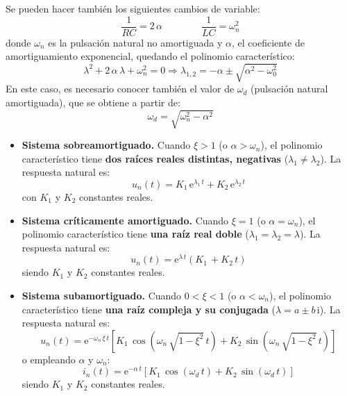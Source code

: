 	\begin{remark}
	Se pueden hacer también los siguientes cambios de variable: 
	\begin{equation*}
	    {\dfrac{1}{RC}=2\,\alpha}\qquad \qquad {\dfrac{1}{LC}=\omega_n^2}
	\end{equation*}
	donde $\omega_n$ es la pulsación natural no amortiguada y $\alpha$, el coeficiente de amortiguamiento exponencial, quedando el polinomio característico: 
	\begin{equation*}
	    \lambda^2+2\,\alpha\,\lambda + \omega_n^2=0 \Rightarrow \lambda_{1,2}=-\alpha \pm \sqrt{\alpha^2 - \omega_0^2}
	\end{equation*}
	En este caso, es necesario conocer también el valor de $\omega_d$ (pulsación natural amortiguada), que se obtiene a partir de:
	\begin{equation*}
	    \omega_d=\sqrt{\omega_n^2-\alpha^2}
	\end{equation*}
	\end{remark}
	
	\begin{itemize}
	    \item \textbf{Sistema sobreamortiguado.} Cuando $\xi>1$ (o $\alpha>\omega_n$), el polinomio característico tiene \textbf{dos raíces reales distintas, negativas} ($\lambda_1\neq\lambda_2$). La respuesta natural es:
    	\begin{equation*}
    	 u_n(t)=K_1\,\mathrm{e}^{\lambda_1\,t}+K_2\,\mathrm{e}^{\lambda_2\,t}   
    	\end{equation*}
	con $K_1$ y $K_2$ constantes reales. 
	    \item \textbf{Sistema críticamente amortiguado.} Cuando $\xi=1$ (o $\alpha=\omega_n$), el polinomio característico tiene \textbf{una raíz real doble} ($\lambda_1=\lambda_2=\lambda$). La respuesta natural es:
	\begin{equation*}
	 u_n(t)=\mathrm{e}^{\lambda\,t}(K_1\,+K_2\,t)   
	\end{equation*}
	siendo $K_1$ y $K_2$ constantes reales. 
	\item \textbf{Sistema subamortiguado.} Cuando $0<\xi<1$ (o $\alpha<\omega_n$), el polinomio característico tiene \textbf{una raíz compleja y su conjugada} ($\lambda=a\pm b\,\mathrm{i}$). La respuesta natural es:
	\begin{equation*}
          u_n(t)=\mathrm{e}^{-\omega_n\,\xi \,t}\left[K_1\,\cos(\omega_n\,\sqrt{1-\xi^2}\,t)+K_2\,\sin(\omega_n\,\sqrt{1-\xi^2}\,t) \right]
        \end{equation*}
	o empleando $\alpha$ y $\omega_n$:
        \begin{equation*}
        i_n(t)=\mathrm{e}^{-\alpha \,t}\left[K_1\,\cos(\omega_d \,t)+K_2\,\sin(\omega_d\,t) \right]
      \end{equation*}
	siendo $K_1$ y $K_2$ constantes reales.
	\end{itemize}
	
